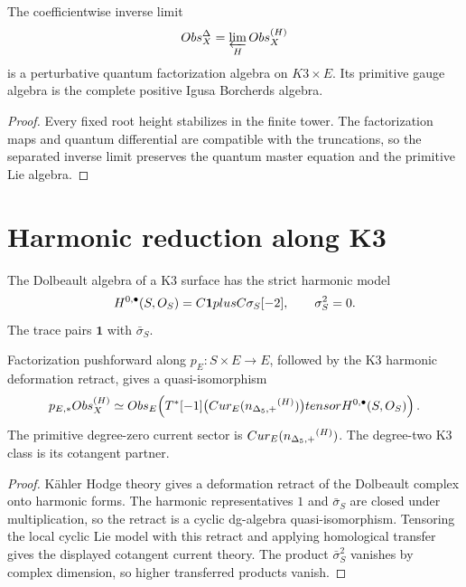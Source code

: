 \begin{corollary}
The coefficientwise inverse limit
\[
 Obs_X^{\Delta}=\varprojlim_HObs_X^{(H)}
\]
is a perturbative quantum factorization algebra on $K3\times E$.  Its primitive gauge algebra is the complete positive Igusa Borcherds algebra.
\end{corollary}
\begin{proof}
Every fixed root height stabilizes in the finite tower.  The factorization maps and quantum differential are compatible with the truncations, so the separated inverse limit preserves the quantum master equation and the primitive Lie algebra.
\end{proof}

\chapter{Harmonic reduction along K3}
The Dolbeault algebra of a K3 surface has the strict harmonic model
\[
 H^{0,\bullet}(S,O_S)
 =C\mathbf1plusC\sigma_S[-2],
 \qquad
 \sigma_S^2=0.
\]
The trace pairs $\mathbf1$ with $\bar\sigma_S$.

\begin{theorem}
Factorization pushforward along $p_E:S\times E\to E$, followed by the K3 harmonic deformation retract, gives a quasi-isomorphism
\[
 p_{E,*}Obs_X^{(H)}
 \simeq
 Obs_E\!\left(
 T^*[-1]\bigl(Cur_E({n_{\Delta_5,+}}^{(H)})\bigr)
 tensor H^{0,\bullet}(S,O_S)
 \right).
\]
The primitive degree-zero current sector is $Cur_E({n_{\Delta_5,+}}^{(H)})$.  The degree-two K3 class is its cotangent partner.
\end{theorem}
\begin{proof}
Kähler Hodge theory gives a deformation retract of the Dolbeault complex onto harmonic forms.  The harmonic representatives $1$ and $\bar\sigma_S$ are closed under multiplication, so the retract is a cyclic dg-algebra quasi-isomorphism.  Tensoring the local cyclic Lie model with this retract and applying homological transfer gives the displayed cotangent current theory.  The product $\bar\sigma_S^2$ vanishes by complex dimension, so higher transferred products vanish.
\end{proof}


